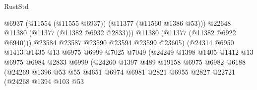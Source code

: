 \begin{lexlean}{RustStd}
\begin{coremodule}
                                            @6937
                                            (@11554 (@11555 @6937))
                                            (@11377 (@11560 @1386 @53)))
                                          @22648
                                          @11380
                                          (@11377 (@11382 @6932 @2833)))
                                        @11380
                                        (@11377 (@11382 @6922 @6940)))
                                      @23584
                                      @23587
                                      @23590
                                      @23594
                                      @23599
                                      @23605)
                                    (@24314
                                      @6950
                                      @1413
                                      @1435
                                      @13
                                      @6975
                                      @6999
                                      @7025
                                      @7049
                                      (@24249
                                        @1398
                                        @1405
                                        @1412
                                        @13
                                        @6975
                                        @6984
                                        @2833
                                        @6999
                                        (@24260
                                          @1397
                                          @489
                                          @19158
                                          @6975
                                          @6982
                                          @6188
                                          (@24269
                                            @1396
                                            @53
                                            @55
                                            @4651
                                            @6974
                                            @6981
                                            @2821
                                            @6955
                                            @2827
                                            @22721
                                            (@24268
                                              @1394
                                              @103
                                              @53

\end{coremodule}
\end{lexlean}
